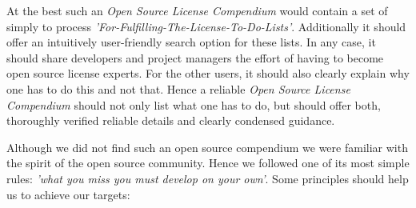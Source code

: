 At the best such an \textit{Open Source License Compendium} would contain a set
of simply to process \textit{'For-Fulfilling-The-License-To-Do-Lists'}.
Additionally it should offer an intuitively user-friendly search option for
these lists. In any case, it should share developers and project managers the
effort of having to become open source license experts. For the other users, it
should also clearly explain why one has to do this and not that. Hence a
reliable \textit{Open Source License Compendium} should not only list what one
has to do, but should offer both, thoroughly verified reliable details and
clearly condensed guidance.

Although we did not find such an open source compendium we were familiar with
the spirit of the open source community. Hence we followed one of its most
simple rules: \emph{'what you miss you must develop on your own'}. Some
principles should help us to achieve our targets:

